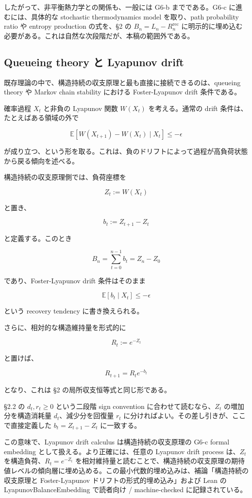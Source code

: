 \documentclass[12pt,a4paper]{article}
\begin{document}
したがって、非平衡熱力学との関係も、一般には G6-b までである。G6-c に進むには、具体的な stochastic thermodynamics model を取り、path probability ratio や entropy production の式を、§2 の \(B_{n}=L_{n}-R_{n}^{\mathrm{rec}}\) に明示的に埋め込む必要がある。これは自然な次段階だが、本稿の範囲外である。

\subsection{Queueing theory と Lyapunov drift}\label{queueing-theory-ux3068-lyapunov-drift}

既存理論の中で、構造持続の収支原理と最も直接に接続できるのは、queueing theory や Markov chain stability における Foster-Lyapunov drift 条件である。

確率過程 \(X_{t}\) と非負の Lyapunov 関数 \(W(X_{t})\) を考える。通常の drift 条件は、たとえばある領域の外で

\[
\mathbb E[W(X_{t+1})-W(X_{t})\mid X_{t}]\le -\epsilon
\]

が成り立つ、という形を取る。これは、負のドリフトによって過程が高負荷状態から戻る傾向を述べる。

構造持続の収支原理側では、負荷座標を

\[
Z_{t} := W(X_{t})
\]

と置き、

\[
b_{t} := Z_{t+1}-Z_{t}
\]

と定義する。このとき

\[
B_{n} = \sum_{t=0}^{n-1} b_{t} = Z_{n}-Z_0
\]

であり、Foster-Lyapunov drift 条件はそのまま

\[
\mathbb E[b_{t}\mid X_{t}]\le -\epsilon
\]

という recovery tendency に書き換えられる。

さらに、相対的な構造維持量を形式的に

\[
R_{t} := e^{-Z_{t}}
\]

と置けば、

\[
R_{t+1}=R_{t} e^{-b_{t}}
\]

となり、これは §2 の局所収支恒等式と同じ形である。

§2.2 の \(d_{t},r_{t}\ge 0\) という二段階 sign convention に合わせて読むなら、\(Z_{t}\) の増加分を構造消耗量 \(d_{t}\)、減少分を回復量 \(r_{t}\) に分ければよい。その差し引きが、ここで直接定義した \(b_{t}=Z_{t+1}-Z_{t}\) に一致する。

この意味で、Lyapunov drift calculus は構造持続の収支原理の G6-c formal embedding として扱える。より正確には、任意の Lyapunov drift process は、\(Z_{t}\) を構造負荷、\(R_{t}=e^{-Z_{t}}\) を相対維持量と読むことで、構造持続の収支原理の期待値レベルの傾向層に埋め込める。この最小代数的埋め込みは、補論「構造持続の収支原理と Foster-Lyapunov ドリフトの形式的埋め込み」および Lean の LyapunovBalanceEmbedding で読者向け / machine-checked に記録されている。
\end{document}
